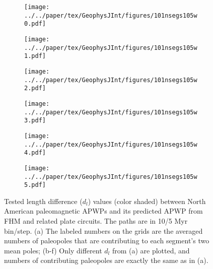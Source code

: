 \begin{figure}[!ht]
  \captionsetup[subfigure]{singlelinecheck=off,justification=raggedright,aboveskip=-6pt,belowskip=-6pt}
  \centering
  \begin{subfigure}{.495\textwidth}
    \texttt{[image: ../../paper/tex/GeophysJInt/figures/101nsegs105w0.pdf]}
    \caption{}\label{fig-na-dlw0}
  \end{subfigure}
  \vspace{.1em}
  \begin{subfigure}{.495\textwidth}
    \texttt{[image: ../../paper/tex/GeophysJInt/figures/101nsegs105w1.pdf]}
    \caption{}\label{fig-na-dlw1}
  \end{subfigure}
  \vspace{.1em}
  \begin{subfigure}{.495\textwidth}
    \texttt{[image: ../../paper/tex/GeophysJInt/figures/101nsegs105w2.pdf]}
    \caption{}\label{fig-na-dlw2}
  \end{subfigure}
  \vspace{.1em}
  \begin{subfigure}{.495\textwidth}
    \texttt{[image: ../../paper/tex/GeophysJInt/figures/101nsegs105w3.pdf]}
    \caption{}\label{fig-na-dlw3}
  \end{subfigure}
  \vspace{.1em}
  \begin{subfigure}{.495\textwidth}
    \texttt{[image: ../../paper/tex/GeophysJInt/figures/101nsegs105w4.pdf]}
    \caption{}\label{fig-na-dlw4}
  \end{subfigure}
  \vspace{.1em}
  \begin{subfigure}{.495\textwidth}
    \texttt{[image: ../../paper/tex/GeophysJInt/figures/101nsegs105w5.pdf]}
    \caption{}\label{fig-na-dlw5}
  \end{subfigure}
  \caption[$d_l$ of each pair of segments for North American 10/5 Myr
    APWPs]{Tested length difference ($d_l$) values (color shaded) between North
    American paleomagnetic APWPs and its predicted APWP from FHM and related
    plate circuits. The paths are in 10/5 Myr bin/step. (a) The labeled numbers
    on the grids are the averaged numbers of paleopoles that are contributing to
    each segment's two mean poles; (b-f) Only different $d_l$ from (a) are
    plotted, and numbers of contributing paleopoles are exactly the same as in
    (a).}\label{fig-nadl}
\end{figure}

